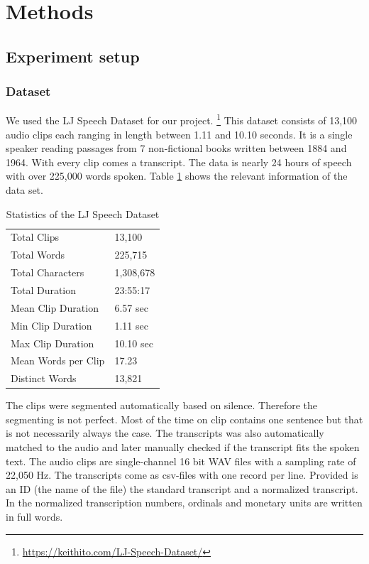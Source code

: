 \documentclass[11pt]{article}
\begin{document}
\section{Methods}\label{sec:methods}

\subsection{Experiment setup}

\subsubsection*{Dataset}

We used the LJ Speech Dataset for our project.%
\footnote{\url{https://keithito.com/LJ-Speech-Dataset/}}
This dataset consists of 13,100 audio clips each ranging in length between 1.11 and 10.10 seconds. It is a single speaker reading passages from 7 non-fictional books written between 1884 and 1964. With every clip comes a transcript. The data is nearly 24 hours of speech with over 225,000 words spoken. Table \ref{t:dataset} shows the relevant information of the data set.
\begin{table}
\centering
\begin{tabular}{ll}
Total Clips & 13,100\\
Total Words & 225,715 \\
Total Characters & 1,308,678\\
Total Duration & 23:55:17\\
Mean Clip Duration  & 6.57 sec\\
Min Clip Duration &	1.11 sec\\
Max Clip Duration &	10.10 sec\\
Mean Words per Clip & 17.23\\
Distinct Words & 13,821\\
\end{tabular}
\caption{Statistics of the LJ Speech Dataset}
\label{t:dataset}
\end{table}

The clips were segmented automatically based on silence. Therefore the segmenting is not perfect. Most of the time on clip contains one sentence but that is not necessarily always the case. The transcripts was also automatically matched to the audio and later manually checked if the transcript fits the spoken text.
The audio clips are single-channel 16 bit WAV files with a sampling rate of 22,050 Hz. The transcripts come as csv-files with one record per line. Provided is an ID (the name of the file) the standard transcript and a normalized transcript. In the normalized transcription numbers, ordinals and monetary units are written in full words. \\
\end{document}
